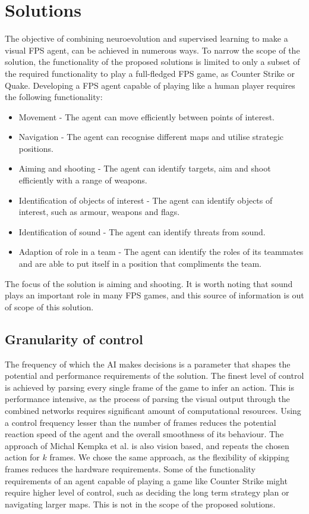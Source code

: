 
\section{Solutions}
The objective of combining neuroevolution and supervised learning to make a visual FPS agent, can be achieved in numerous ways. To narrow the scope of the solution, the functionality of the proposed solutions is limited to only a subset of the required functionality to play a full-fledged FPS game, as Counter Strike or Quake. Developing a FPS agent capable of playing like a human player requires the following functionality:
\begin{itemize}
\item Movement - The agent can move efficiently between points of interest.
\item Navigation - The agent can recognise different maps and utilise strategic positions.
\item Aiming and shooting - The agent can identify targets, aim and shoot efficiently with a range of weapons.
\item Identification of objects of interest - The agent can identify objects of interest, such as armour, weapons and flags.
\item Identification of sound - The agent can identify threats from sound.
\item Adaption of role in a team - The agent can identify the roles of its teammates and are able to put itself in a position that compliments the team.
\end{itemize}
The focus of the solution is aiming and shooting. It is worth noting that sound plays an important role in many FPS games, and this source of information is out of scope of this solution.

\subsection{Granularity of control}
The frequency of which the AI makes decisions is a parameter that shapes the potential and performance requirements of the solution. The finest level of control is achieved by parsing every single frame of the game to infer an action. This is performance intensive, as the process of parsing the visual output through the combined networks requires significant amount of computational resources. Using a control frequency lesser than the number of frames reduces the potential reaction speed of the agent and the overall smoothness of its behaviour. The approach of Michal Kempka et al.\cite{vizdoom} is also vision based, and repeats the chosen action for $k$ frames. We chose the same approach, as the flexibility of skipping frames reduces the hardware requirements.
Some of the functionality requirements of an agent capable of playing a game like Counter Strike might require higher level of control, such as deciding the long term strategy plan or navigating larger maps. This is not in the scope of the proposed solutions.

